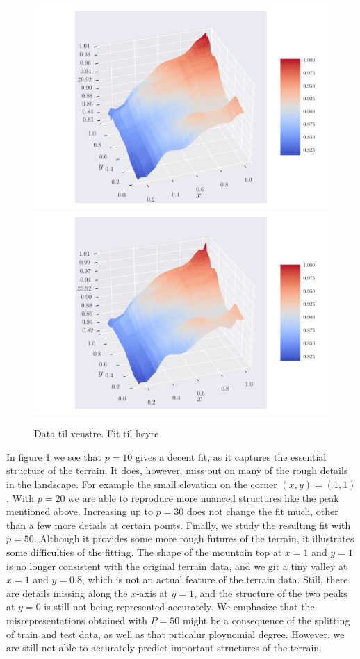 \documentclass[reprint,english,notitlepage,aps,nobalancelastpage,nofootinbib]{revtex4-1}  %
\begin{document}
\begin{figure}[H]
	\includegraphics[width=\linewidth]{SRTM_prediction_p30.pdf}
	\endminipage\hfill
	\includegraphics[width=\linewidth]{SRTM_prediction_p50.pdf}
	\endminipage
	\caption{Data til venstre. Fit til høyre}
  \label{fig:terrain_fit}
\end{figure}

In figure \ref{fig:terrain_fit} we see that $p=10$ gives a decent fit, as it captures the essential structure of the terrain. It does, however, miss out on many of the rough details in the landscape. For example the small elevation on the corner $(x,y) = (1,1)$. With $p=20$ we are able to reproduce more nuanced structures like the peak mentioned above. Increasing up to $p=30$ does not change the fit much, other than a few more details at certain points. Finally, we study the resulting fit with $p=50$. Although it provides some more rough futures of the terrain, it illustrates some difficulties of the fitting. The shape of the mountain top at $x=1$ and $y=1$ is no longer consistent with the original terrain data, and we git a tiny valley at $x=1$ and $y=0.8$, which is not an actual feature of the terrain data. Still, there are details missing along the $x$-axis at $y=1$, and the structure of the two peaks at $y=0$ is still not being represented accurately. We emphasize that the misrepresentations obtained with $P=50$ might be a consequence of the splitting of train and test data, as well as that prticalur ploynomial degree. However, we are still not able to accurately predict important structures of the terrain.
\end{document}
